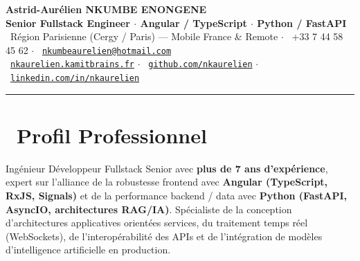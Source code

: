 \documentclass[10pt,a4paper]{article}
\begin{document}
\begin{center}
    {\LARGE\bfseries\color{primary} Astrid-Aurélien NKUMBE ENONGENE}\\[0.25em]
    {\large\bfseries\color{darkgray} Senior Fullstack Engineer $\cdot$ Angular / TypeScript $\cdot$ Python / FastAPI}\\[0.4em]
    {\footnotesize\color{slateGray}
        \faMapMarker*\ Région Parisienne (Cergy / Paris) --- Mobile France \& Remote \quad$\cdot$\quad
        \faPhone*\ +33 7 44 58 45 62 \quad$\cdot$\quad
        \faEnvelope\ \href{mailto:nkumbeaurelien@hotmail.com}{\texttt{nkumbeaurelien@hotmail.com}}\\[0.25em]
        \faGlobe\ \href{https://nkaurelien.kamitbrains.fr}{\texttt{nkaurelien.kamitbrains.fr}} \quad$\cdot$\quad
        \faGithub\ \href{https://github.com/nkaurelien}{\texttt{github.com/nkaurelien}} \quad$\cdot$\quad
        \faLinkedin\ \href{https://www.linkedin.com/in/nkaurelien/}{\texttt{linkedin.com/in/nkaurelien}}
    }
\end{center}

\vspace{0.1em}
\textcolor{ruleGray}{\rule{\linewidth}{1pt}}
\vspace{0.35em}

\section{\faLightbulb\ Profil Professionnel}
Ingénieur Développeur Fullstack Senior avec \textbf{plus de 7 ans d'expérience}, expert sur l'alliance de la robustesse frontend avec \textbf{Angular (TypeScript, RxJS, Signals)} et de la performance backend / data avec \textbf{Python (FastAPI, AsyncIO, architectures RAG/IA)}. Spécialiste de la conception d'architectures applicatives orientées services, du traitement temps réel (WebSockets), de l'interopérabilité des APIs et de l'intégration de modèles d'intelligence artificielle en production.

\end{document}
